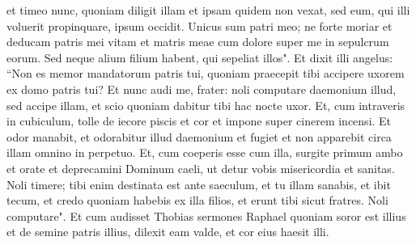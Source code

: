 \begin{biblechapter}
\verse et timeo nunc, quoniam diligit illam et ipsam quidem non vexat, sed eum, qui illi voluerit propinquare, ipsum occidit. Unicus sum patri meo; ne forte moriar et deducam patris mei vitam et matris meae cum dolore super me in sepulcrum eorum. Sed neque alium filium habent, qui sepeliat illos". 
\verse Et dixit illi angelus: “Non es memor mandatorum patris tui, quoniam praecepit tibi accipere uxorem ex domo patris tui? Et nunc audi me, frater: noli computare daemonium illud, sed accipe illam, et scio quoniam dabitur tibi hac nocte uxor. 
\verse Et, cum intraveris in cubiculum, tolle de iecore piscis et cor et impone super cinerem incensi. Et odor manabit, et odorabitur illud daemonium et fugiet et non apparebit circa illam omnino in perpetuo. 
\verse Et, cum coeperis esse cum illa, surgite primum ambo et orate et deprecamini Dominum caeli, ut detur vobis misericordia et sanitas. Noli timere; tibi enim destinata est ante saeculum, et tu illam sanabis, et ibit tecum, et credo quoniam habebis ex illa filios, et erunt tibi sicut fratres. Noli computare". Et cum audisset Thobias sermones Raphael quoniam soror est illius et de semine patris illius, dilexit eam valde, et cor eius haesit illi. 
\end{biblechapter}

